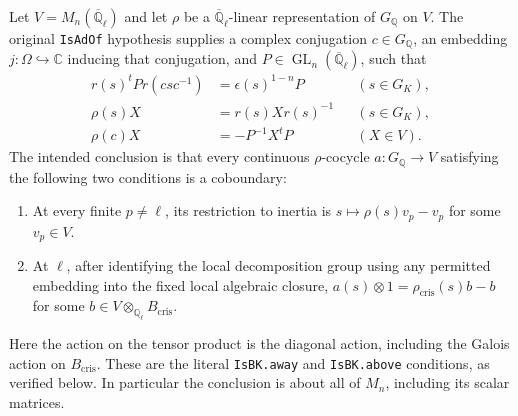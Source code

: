 \documentclass[11pt,a4paper]{article}
\numberwithin{equation}{section}
\theoremstyle{remark}\newtheorem{remark}[theorem]{Remark}
\begin{document}
Let $V=M_n(\overline{\mathbb Q}_\ell)$ and let $\rho$ be a
$\overline{\mathbb Q}_\ell$-linear representation of $G_{\mathbb Q}$
on $V$.  The original \texttt{Is\allowbreak Ad\allowbreak Of} hypothesis supplies a complex
conjugation $c\in G_{\mathbb Q}$, an embedding
$j:\Omega\hookrightarrow\mathbb C$ inducing that conjugation, and
$P\in\operatorname{GL}_n(\overline{\mathbb Q}_\ell)$, such that
\begin{align}
 r(s)^tP r(csc^{-1})&=\epsilon(s)^{1-n}P &&(s\in G_K),
                 \tag{ADK.4}\\
 \rho(s)X&=r(s)Xr(s)^{-1} &&(s\in G_K),
                 \tag{ADK.5}\\
 \rho(c)X&=-P^{-1}X^tP &&(X\in V).
                 \tag{ADK.6}
\end{align}
The intended conclusion is that every continuous $\rho$-cocycle
$a:G_{\mathbb Q}\to V$ satisfying the following two conditions is a
coboundary:
\begin{enumerate}
\item At every finite $p\ne\ell$, its restriction to inertia is
  $s\mapsto\rho(s)v_p-v_p$ for some $v_p\in V$.
\item At $\ell$, after identifying the local decomposition group
  using any permitted embedding into the fixed local algebraic
  closure, $a(s)\otimes1=\rho_{\mathrm{cris}}(s)b-b$ for some
  $b\in V\otimes_{\mathbb Q_\ell}B_{\mathrm{cris}}$.
\end{enumerate}
Here the action on the tensor product is the diagonal action, including
the Galois action on $B_{\mathrm{cris}}$.  These are the literal
\texttt{Is\allowbreak BK.\allowbreak away} and \texttt{Is\allowbreak BK.\allowbreak above} conditions, as verified
below.  In particular the conclusion is about all of $M_n$, including
its scalar matrices.
\end{document}

